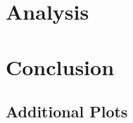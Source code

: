 \documentclass[a4paper,11pt]{article}
\begin{document}
\section{Analysis}

\section{Conclusion}

\begin{appendix}
  \section{Additional Plots}
  \begin{figure}[H]
    \centering
    
    \caption{\label{fig:label} }
  \end{figure}

  \begin{figure}[H]
    \centering
    
    \caption{\label{fig:label} }
  \end{figure}

  \begin{figure}[H]
    \centering
    
    \caption{\label{fig:label} }
  \end{figure}

  \begin{figure}[H]
    \centering
    
    \caption{\label{fig:label} }
  \end{figure}

  \begin{figure}[H]
    \centering
    
    \caption{\label{fig:label} }
  \end{figure}

  \begin{figure}[H]
    \centering
    
    \caption{\label{fig:label} }
  \end{figure}

  \begin{figure}[H]
    \centering
    
    \caption{\label{fig:label} }
  \end{figure}

\end{appendix}
\end{document}
